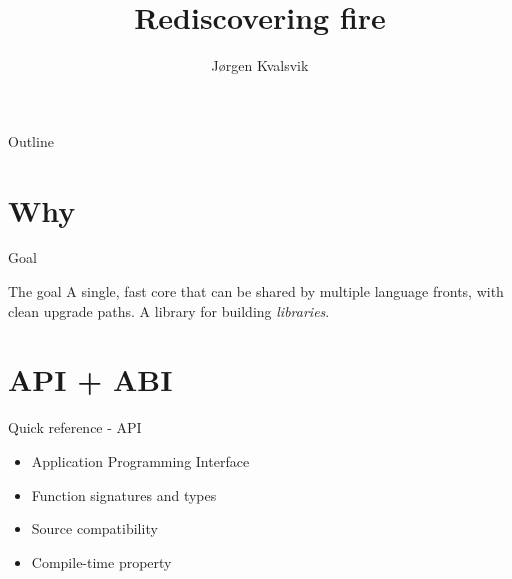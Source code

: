 \documentclass[pdf]{beamer}
\title{Rediscovering fire}
\author{Jørgen Kvalsvik}
\begin{document}
\maketitle

\begin{frame}{Outline}
    \tableofcontents
\end{frame}

\section{Why}

\begin{frame}{Goal}
    \begin{block}{The goal}
        A single, fast core that can be shared by multiple language fronts,
        with clean upgrade paths. A library for building \emph{libraries}.
    \end{block}
\end{frame}

\section{API + ABI}

\begin{frame}{Quick reference - API}
    \begin{itemize}[<+>]
        \item Application Programming Interface
        \item Function signatures and types
        \item Source compatibility
        \item Compile-time property
    \end{itemize}

\end{frame}
\end{document}

